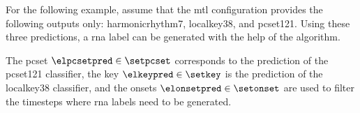 
For the following example, assume that the \gls{mtl}
configuration provides the following outputs only:
\gls{harmonicrhythm7}, \gls{localkey38}, and \gls{pcset121}.
Using these three predictions, a \gls{rna} label can be
generated with the help of the \algorithmrn{} algorithm.

The \gls{pcset} $\elpcsetpred \in \setpcset$ corresponds to
the prediction of the \gls{pcset121} classifier, the key
$\elkeypred \in \setkey$ is the prediction of the
\gls{localkey38} classifier, and the onsets $\elonsetpred
\in \setonset$ are used to filter the timesteps where
\gls{rna} labels need to be generated.
